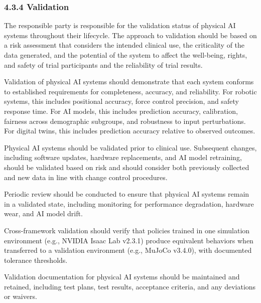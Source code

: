 \subsubsection{4.3.4 Validation}

\begin{description}[leftmargin=2.5cm,style=sameline]

\item[(a)] The responsible party is responsible for the validation status of physical AI systems throughout their lifecycle. The approach to validation should be based on a risk assessment that considers the intended clinical use, the criticality of the data generated, and the potential of the system to affect the well-being, rights, and safety of trial participants and the reliability of trial results.

\item[(b)] Validation of physical AI systems should demonstrate that each system conforms to established requirements for completeness, accuracy, and reliability. For robotic systems, this includes positional accuracy, force control precision, and safety response time. For AI models, this includes prediction accuracy, calibration, fairness across demographic subgroups, and robustness to input perturbations. For digital twins, this includes prediction accuracy relative to observed outcomes.

\item[(c)] Physical AI systems should be validated prior to clinical use. Subsequent changes, including software updates, hardware replacements, and AI model retraining, should be validated based on risk and should consider both previously collected and new data in line with change control procedures.

\item[(d)] Periodic review should be conducted to ensure that physical AI systems remain in a validated state, including monitoring for performance degradation, hardware wear, and AI model drift.

\item[(e)] Cross-framework validation should verify that policies trained in one simulation environment (e.g., NVIDIA Isaac Lab v2.3.1) produce equivalent behaviors when transferred to a validation environment (e.g., MuJoCo v3.4.0), with documented tolerance thresholds.

\item[(f)] Validation documentation for physical AI systems should be maintained and retained, including test plans, test results, acceptance criteria, and any deviations or waivers.

\end{description}

